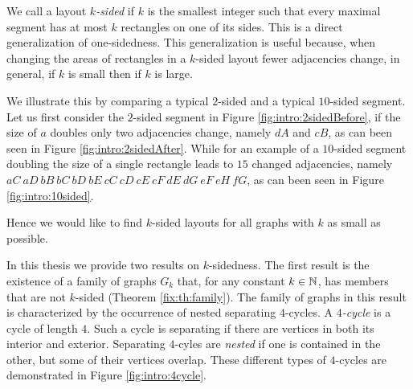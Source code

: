   We call a layout \emph{$k$-sided} if $k$ is the smallest integer such that every maximal segment has at most $k$ rectangles on one of its sides. This is a direct generalization of one-sidedness.
  This generalization is useful because, when changing the areas of rectangles in a $k$-sided layout fewer adjacencies change, in general, if $k$ is small then if $k$ is large.

  We illustrate this by comparing a typical $2$-sided and a typical $10$-sided segment.
  Let us first consider the $2$-sided segment in Figure \ref{fig:intro:2sidedBefore}, if the size of $a$ doubles only two adjacencies change, namely $dA$ and $cB$, as can been seen in Figure \ref{fig:intro:2sidedAfter}.
  While for an example of a $10$-sided segment doubling the size of a single rectangle leads to $15$ changed adjacencies, namely $aC\ aD\ bB\ bC\ bD\ bE\ cC\ cD\ cE\ cF\ dE\ dG\ eF\ eH\ fG$, as can been seen in Figure \ref{fig:intro:10sided}.

  Hence we would like to find $k$-sided layouts for all graphs with $k$ as small as possible.


  In this thesis we provide two results on $k$-sidedness. The first result is the existence of a family of graphs $G_k$ that, for any constant $k \in \mathbb{N}$, has members that are not $k$-sided (Theorem \ref{fix:th:family}). The family of graphs in this result is characterized by the occurrence of nested separating $4$-cycles.
  A \emph{$4$-cycle} is a cycle of length $4$.
  Such a cycle is separating if there are vertices in both its interior and exterior.
  Separating $4$-cyles are \emph{nested} if one is contained in the other, but some of their vertices overlap. These different types of $4$-cycles are demonstrated in Figure \ref{fig:intro:4cycle}.

  \newpage

